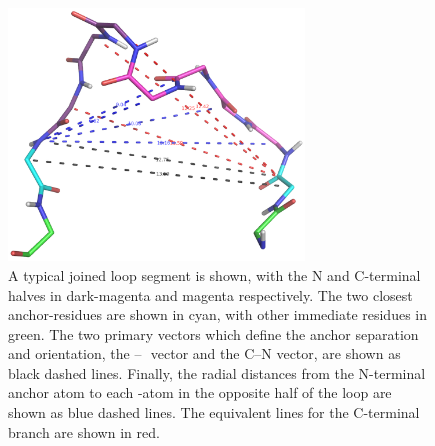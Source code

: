 \begin{figure}[hbtp]
\begin{center}
\includegraphics[width=0.7\textwidth]{09-Arcus/segdist/seg_fan.png}
\end{center}
\caption[A typical joined  loop segment]{A typical joined  loop segment is shown, with the N and C-terminal halves in dark-magenta and magenta respectively. 
The two closest anchor-residues are shown in cyan, with other immediate residues in green. The two primary vectors which define the
anchor separation and orientation, the \ca--\,\ca\ vector and the C--N vector, are shown as black dashed lines. 
Finally, the radial distances from the N-terminal anchor atom to each \mbox{\ca-atom} in the opposite half of the loop are shown as blue dashed lines. The equivalent lines for the C-terminal branch are shown in red.}
\label{fig:arcus:segfan}
\end{figure}

